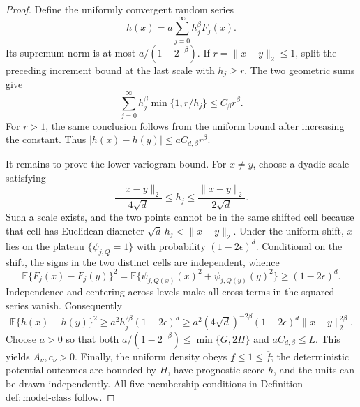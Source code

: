 \documentclass{article}
\begin{document}
\begin{proof}
Define the uniformly convergent random series
\[
h(x)=a\sum_{j=0}^\infty h_j^\beta F_j(x).
\]
Its supremum norm is at most \(a/(1-2^{-\beta})\).  If \(r=\|x-y\|_2\le1\), split the preceding increment bound at the last scale with \(h_j\ge r\).  The two geometric sums give
\[
\sum_{j=0}^\infty h_j^\beta\min\{1,r/h_j\}
\le C_\beta r^\beta.
\]
For \(r>1\), the same conclusion follows from the uniform bound after increasing the constant.  Thus \(|h(x)-h(y)|\le aC_{d,\beta}r^\beta\).

It remains to prove the lower variogram bound.  For \(x\ne y\), choose a dyadic scale satisfying
\[
\frac{\|x-y\|_2}{4\sqrt d}\le h_j\le\frac{\|x-y\|_2}{2\sqrt d}.
\]
Such a scale exists, and the two points cannot be in the same shifted cell because that cell has Euclidean diameter \(\sqrt d\,h_j<\|x-y\|_2\).  Under the uniform shift, \(x\) lies on the plateau \(\{\psi_{j,Q}=1\}\) with probability \((1-2\epsilon)^d\).  Conditional on the shift, the signs in the two distinct cells are independent, whence
\[
\mathbb E\{F_j(x)-F_j(y)\}^2
=\mathbb E\{\psi_{j,Q(x)}(x)^2+\psi_{j,Q(y)}(y)^2\}
\ge(1-2\epsilon)^d.
\]
Independence and centering across levels make all cross terms in the squared series vanish.  Consequently
\[
\mathbb E\{h(x)-h(y)\}^2
\ge a^2h_j^{2\beta}(1-2\epsilon)^d
\ge a^2(4\sqrt d)^{-2\beta}(1-2\epsilon)^d\|x-y\|_2^{2\beta}.
\]
Choose \(a>0\) so that both \(a/(1-2^{-\beta})\le\min\{G,2H\}\) and \(aC_{d,\beta}\le L\).  This yields \(A_\nu,c_\nu>0\).  Finally, the uniform density obeys \(\underline f\le1\le\overline f\); the deterministic potential outcomes are bounded by \(H\), have prognostic score \(h\), and the units can be drawn independently.  All five membership conditions in Definition \(\mathrm{def:model\text{-}class}\) follow.
\end{proof}
\end{document}

